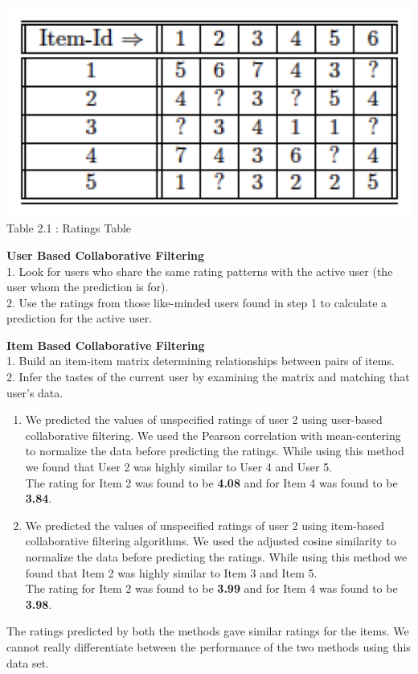 \documentclass[11pt]{article}
\begin{document}
\begin{enumerate}
\begin{center}
    \includegraphics[height=0.2\textwidth]{hgjg.png}
    \\\footnotesize Table 2.1 : Ratings Table
\end{center}

\textbf{User Based Collaborative Filtering }
\\1. Look for users who share the same rating patterns with the active user (the user whom the prediction is for).
\\2. Use the ratings from those like-minded users found in step 1 to calculate a prediction for the active user.

\textbf{Item Based Collaborative Filtering }
\\1. Build an item-item matrix determining relationships between pairs of items.
\\2. Infer the tastes of the current user by examining the matrix and matching that user's data.

\begin{enumerate}
    \item We predicted the values of unspecified ratings of user 2 using user-based collaborative filtering. We used the Pearson correlation with mean-centering to normalize the data before predicting the ratings. While using this method we found that User 2 was highly similar to User 4 and User 5.
    \\The rating for Item 2 was found to be \textbf{4.08} and for Item 4 was found to be \textbf{3.84}.
    
    \item We predicted the values of unspecified ratings of user 2 using item-based collaborative filtering algorithms. We used the adjusted cosine similarity to normalize the data before predicting the ratings. While using this method we found that Item 2 was highly similar to Item 3 and Item 5.
    \\The rating for Item 2 was found to be \textbf{3.99} and for Item 4 was found to be \textbf{3.98}.
\end{enumerate}


The ratings predicted by both the methods gave similar ratings for the items. We cannot really differentiate between the performance of the two methods using this data set.
\newpage


\end{enumerate}
\end{document}
